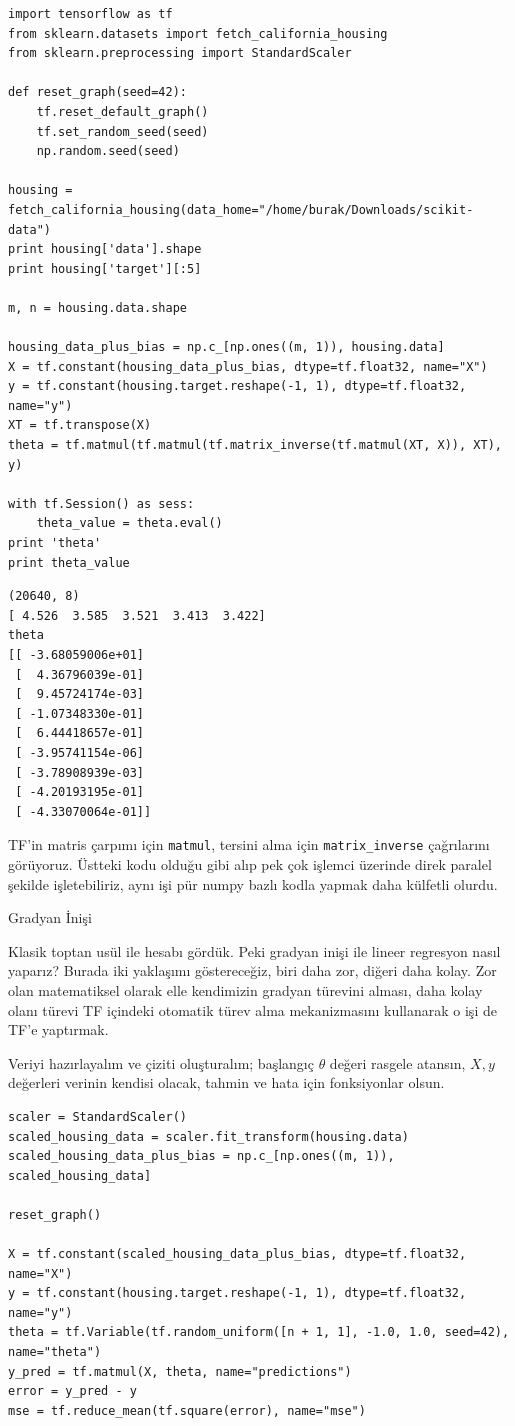 \documentclass[12pt,fleqn]{article}\usepackage{../../common}
\begin{document}
\begin{verbatim}
import tensorflow as tf
from sklearn.datasets import fetch_california_housing
from sklearn.preprocessing import StandardScaler

def reset_graph(seed=42):
    tf.reset_default_graph()
    tf.set_random_seed(seed)
    np.random.seed(seed)

housing = fetch_california_housing(data_home="/home/burak/Downloads/scikit-data")
print housing['data'].shape
print housing['target'][:5]

m, n = housing.data.shape

housing_data_plus_bias = np.c_[np.ones((m, 1)), housing.data]
X = tf.constant(housing_data_plus_bias, dtype=tf.float32, name="X")
y = tf.constant(housing.target.reshape(-1, 1), dtype=tf.float32, name="y")
XT = tf.transpose(X)
theta = tf.matmul(tf.matmul(tf.matrix_inverse(tf.matmul(XT, X)), XT), y)

with tf.Session() as sess:
    theta_value = theta.eval()
print 'theta'
print theta_value
\end{verbatim}

\begin{verbatim}
(20640, 8)
[ 4.526  3.585  3.521  3.413  3.422]
theta
[[ -3.68059006e+01]
 [  4.36796039e-01]
 [  9.45724174e-03]
 [ -1.07348330e-01]
 [  6.44418657e-01]
 [ -3.95741154e-06]
 [ -3.78908939e-03]
 [ -4.20193195e-01]
 [ -4.33070064e-01]]
\end{verbatim}

TF'in matris çarpımı için \verb!matmul!, tersini alma için
\verb!matrix_inverse! çağrılarını görüyoruz. Üstteki kodu olduğu gibi alıp
pek çok işlemci üzerinde direk paralel şekilde işletebiliriz, aynı işi pür
numpy bazlı kodla yapmak daha külfetli olurdu.

Gradyan İnişi

Klasik toptan usül ile hesabı gördük. Peki gradyan inişi ile lineer
regresyon nasıl yaparız? Burada iki yaklaşımı göstereceğiz, biri daha zor,
diğeri daha kolay. Zor olan matematiksel olarak elle kendimizin gradyan
türevini alması, daha kolay olanı türevi TF içindeki otomatik türev alma
mekanizmasını kullanarak o işi de TF'e yaptırmak.

Veriyi hazırlayalım ve çiziti oluşturalım; başlangıç $\theta$ değeri
rasgele atansın, $X,y$ değerleri verinin kendisi olacak, tahmin ve hata
için fonksiyonlar olsun.

\begin{verbatim}
scaler = StandardScaler()
scaled_housing_data = scaler.fit_transform(housing.data)
scaled_housing_data_plus_bias = np.c_[np.ones((m, 1)), scaled_housing_data]

reset_graph()

X = tf.constant(scaled_housing_data_plus_bias, dtype=tf.float32, name="X")
y = tf.constant(housing.target.reshape(-1, 1), dtype=tf.float32, name="y")
theta = tf.Variable(tf.random_uniform([n + 1, 1], -1.0, 1.0, seed=42), name="theta")
y_pred = tf.matmul(X, theta, name="predictions")
error = y_pred - y
mse = tf.reduce_mean(tf.square(error), name="mse")
\end{verbatim}
\end{document}
